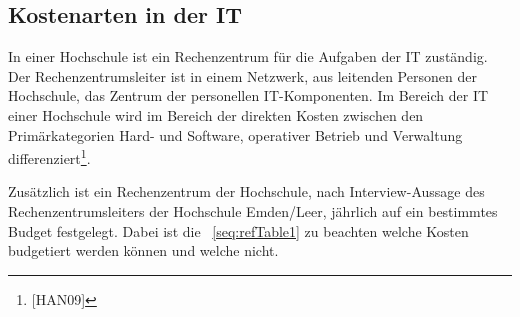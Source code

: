 \documentclass[a4paper]{article}
\begin{document}
\subsection*{}
\clearpage\subsection{Kostenarten in der IT}
{\sffamily
In einer Hochschule ist ein Rechenzentrum für die Aufgaben der IT zuständig.\newline
Der Rechenzentrumsleiter ist in einem Netzwerk, aus leitenden Personen der Hochschule, das Zentrum der personellen
IT-Komponenten. Im Bereich der IT einer Hochschule wird im Bereich der direkten Kosten zwischen den
Prim\"{a}rkategorien Hard- und Software, operativer Betrieb und Verwaltung differenziert\footnote{[HAN09]}.}


\bigskip

{\sffamily
Zusätzlich ist ein Rechenzentrum der Hochschule, nach Interview-Aussage des Rechenzentrumsleiters der Hochschule
Emden/Leer, jährlich auf ein bestimmtes Budget festgelegt. Dabei ist die \tablename~\ref{seq:refTable1} zu beachten
welche Kosten budgetiert werden können und welche nicht.}


\bigskip
\end{document}

